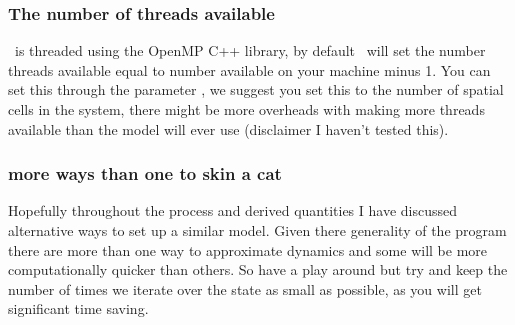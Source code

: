 \subsubsection*{The number of threads available} 
\IBM\ is threaded using the OpenMP C++ library, by default \IBM\ will set the number threads available equal to number available on your machine minus 1. You can set this through the  parameter , we suggest you set this to the number of spatial cells in the system, there might be more overheads with making more threads available than the model will ever use (disclaimer I haven't tested this). 

\subsubsection*{more ways than one to skin a cat} 
Hopefully throughout the process and derived quantities I have discussed alternative ways to set up a similar model. Given there generality of the program there are more than one way to approximate dynamics and some will be more computationally quicker than others. So have a play around but try and keep the number of times we iterate over the state as small as possible, as you will get significant time saving.
